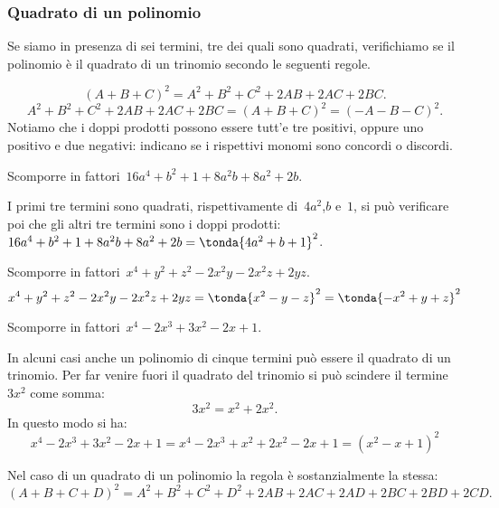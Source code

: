 \subsubsection{Quadrato di un polinomio}
\label{subsubsec:divpol_quadpol}

Se siamo in presenza di sei termini, tre dei quali sono quadrati, 
verifichiamo se il polinomio è il quadrato di un trinomio secondo le seguenti 
regole.

\begin{equation*}
(A+B+C)^{2}=A^{2}+B^{2}+C^{2}+2AB+2AC+2BC.
\end{equation*}
\begin{equation*}
A^{2}+B^{2}+C^{2}+2AB+2AC+2BC=(A+B+C)^{2}=(-A-B-C)^{2}.
\end{equation*}
Notiamo che i doppi prodotti possono essere tutt'e tre positivi, oppure uno 
positivo e due negativi: indicano se i rispettivi monomi sono concordi o 
discordi.

 \begin{esempio}
Scomporre in fattori~\(16a^{4}+b^{2}+1+8a^{2}b+8a^{2}+2b\).

I primi tre termini sono quadrati, rispettivamente di~\(4a^{2}\),\(b\) 
e~\(1\), si può verificare poi che gli altri tre termini sono i doppi 
prodotti:~\(16a^{4}+b^{2}+1+8a^{2}b+8a^{2}+2b=\tonda{4a^{2}+b+1}^{2}\).
 \end{esempio}

 \begin{esempio}
Scomporre in fattori~\(x^4+y^{2}+z^{2}-2x^2y-2x^2z+2yz\).
\[x^4+y^{2}+z^{2}-2x^2y-2x^2z+2yz=
  \tonda{x^2-y-z}^{2}=\tonda{-x^2+y+z}^{2}\]
 \end{esempio}

 \begin{esempio}
Scomporre in fattori~\(x^4-2x^3+3x^2-2x+1\).

In alcuni casi anche un polinomio di cinque termini può essere il quadrato di 
un trinomio.
Per far venire fuori il quadrato del trinomio si può scindere il 
termine~\(3x^2\) come somma:
\[3x^2=x^2+2x^2.\]
In questo modo si ha:
\[x^4-2x^3+3x^2-2x+1=x^4-2x^3+x^2+2x^2-2x+1=(x^2-x+1)^{2}\]
 \end{esempio}

Nel caso di un quadrato di un polinomio la regola è sostanzialmente la stessa:
\begin{equation*}
(A+B+C+D)^{2}=A^{2}+B^{2}+C^{2}+D^{2}+2AB+2AC+2AD+2BC+2BD+2CD.
\end{equation*}


